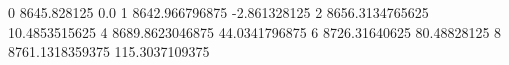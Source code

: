 0 8645.828125 0.0
1 8642.966796875 -2.861328125
2 8656.3134765625 10.4853515625
4 8689.8623046875 44.0341796875
6 8726.31640625 80.48828125
8 8761.1318359375 115.3037109375
